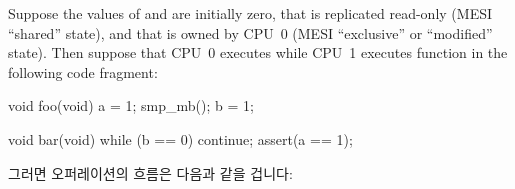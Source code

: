 Suppose the values of  and  are initially zero,
that  is replicated read-only (MESI ``shared'' state),
and that 
is owned by CPU~0 (MESI ``exclusive'' or ``modified'' state).
Then suppose that CPU~0 executes  while CPU~1 executes
function  in the following code fragment:

\fi

\begin{fcvlabel}
\begin{VerbatimN}[fontsize=\footnotesize,samepage=true,commandchars=\\\[\]]
void foo(void)
{
	a = 1;
	smp_mb();	\lnlbl[mb]
	b = 1;
}

void bar(void)
{
	while (b == 0) continue;
	assert(a == 1);
}
\end{VerbatimN}
\end{fcvlabel}

그러면 오퍼레이션의 흐름은 다음과 같을 겁니다:

\iffalse

Then the sequence of operations might be as follows:

\fi


